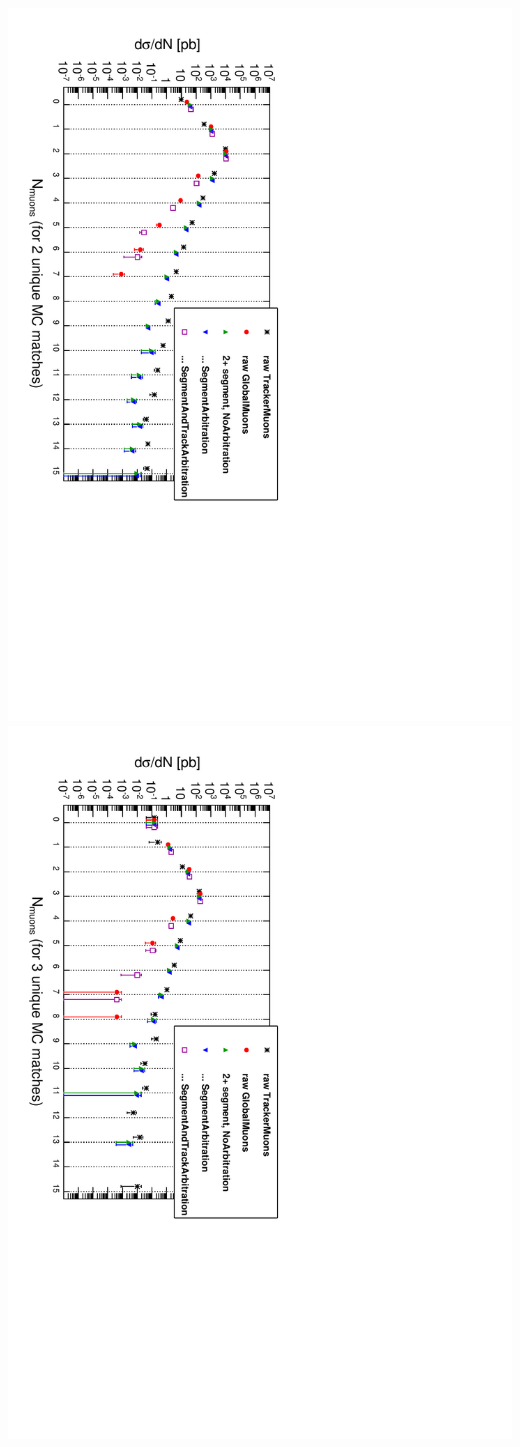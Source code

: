 \documentclass[compress]{beamer}
\begin{document}
\begin{frame}
\includegraphics[height=0.49\linewidth, angle=90]{tracks_lastpage_2real.pdf}
\includegraphics[height=0.49\linewidth, angle=90]{tracks_lastpage_3real.pdf}
\end{frame}
\end{document}
